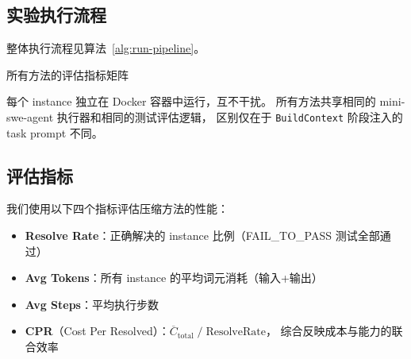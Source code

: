\subsection{实验执行流程}
\label{subsec:run-pipeline}

整体执行流程见算法~\ref{alg:run-pipeline}。

\begin{algorithm}[H]
\caption{批量实验执行流程}
\label{alg:run-pipeline}

\BlankLine
{}
\Return 所有方法的评估指标矩阵\;
\end{algorithm}

每个 instance 独立在 Docker 容器中运行，互不干扰。
所有方法共享相同的 mini-swe-agent 执行器和相同的测试评估逻辑，
区别仅在于 \texttt{BuildContext} 阶段注入的 task prompt 不同。

\subsection{评估指标}
\label{subsec:metrics}

我们使用以下四个指标评估压缩方法的性能：

\begin{itemize}
\item \textbf{Resolve Rate}：正确解决的 instance 比例（FAIL\_TO\_PASS 测试全部通过）
\item \textbf{Avg Tokens}：所有 instance 的平均词元消耗（输入+输出）
\item \textbf{Avg Steps}：平均执行步数
\item \textbf{CPR}（Cost Per Resolved）：$\overline{C}_{\text{total}} \;/\; \text{ResolveRate}$，
综合反映成本与能力的联合效率
\end{itemize}


